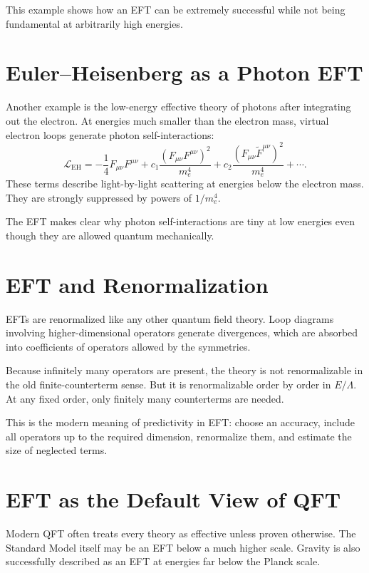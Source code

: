 This example shows how an EFT can be extremely successful while not being
fundamental at arbitrarily high energies.

\section{Euler--Heisenberg as a Photon EFT}

Another example is the low-energy effective theory of photons after integrating
out the electron. At energies much smaller than the electron mass, virtual
electron loops generate photon self-interactions:
\[
    \mathcal{L}_{\mathrm{EH}}
    = -\frac{1}{4}F_{\mu\nu}F^{\mu\nu}
      + c_1\frac{(F_{\mu\nu}F^{\mu\nu})^2}{m_e^4}
      + c_2\frac{(F_{\mu\nu}\widetilde F^{\mu\nu})^2}{m_e^4}
      +\cdots.
\]
These terms describe light-by-light scattering at energies below the electron
mass. They are strongly suppressed by powers of \(1/m_e^4\).

The EFT makes clear why photon self-interactions are tiny at low energies even
though they are allowed quantum mechanically.

\section{EFT and Renormalization}

EFTs are renormalized like any other quantum field theory. Loop diagrams
involving higher-dimensional operators generate divergences, which are absorbed
into coefficients of operators allowed by the symmetries.

Because infinitely many operators are present, the theory is not renormalizable
in the old finite-counterterm sense. But it is renormalizable order by order in
\(E/\Lambda\). At any fixed order, only finitely many counterterms are needed.

This is the modern meaning of predictivity in EFT: choose an accuracy, include
all operators up to the required dimension, renormalize them, and estimate the
size of neglected terms.

\section{EFT as the Default View of QFT}

Modern QFT often treats every theory as effective unless proven otherwise. The
Standard Model itself may be an EFT below a much higher scale. Gravity is also
successfully described as an EFT at energies far below the Planck scale.

